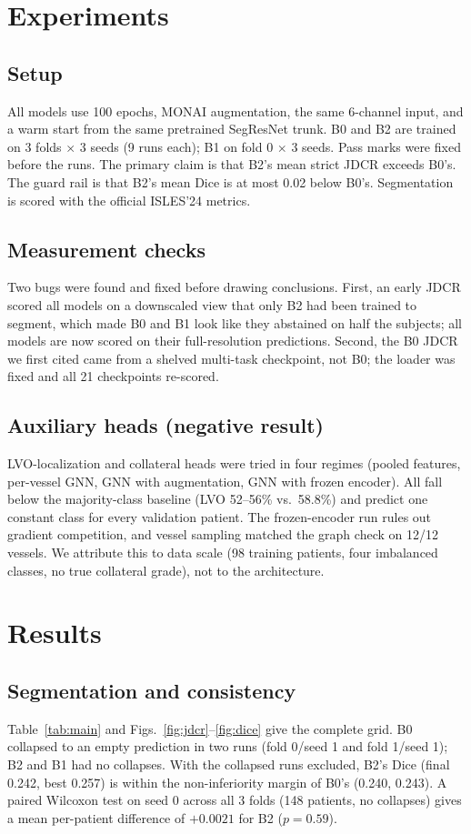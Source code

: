 \documentclass[conference]{IEEEtran}
\begin{document}
\section{Experiments}
\subsection{Setup}
All models use 100 epochs, MONAI augmentation, the same 6-channel input, and a warm start from the same pretrained SegResNet trunk. B0 and B2 are trained on 3 folds $\times$ 3 seeds (9 runs each); B1 on fold 0 $\times$ 3 seeds. Pass marks were fixed before the runs. The primary claim is that B2's mean strict JDCR exceeds B0's. The guard rail is that B2's mean Dice is at most 0.02 below B0's. Segmentation is scored with the official ISLES'24 metrics.

\subsection{Measurement checks}
Two bugs were found and fixed before drawing conclusions. First, an early JDCR scored all models on a downscaled view that only B2 had been trained to segment, which made B0 and B1 look like they abstained on half the subjects; all models are now scored on their full-resolution predictions. Second, the B0 JDCR we first cited came from a shelved multi-task checkpoint, not B0; the loader was fixed and all 21 checkpoints re-scored.

\subsection{Auxiliary heads (negative result)}
LVO-localization and collateral heads were tried in four regimes (pooled features, per-vessel GNN, GNN with augmentation, GNN with frozen encoder). All fall below the majority-class baseline (LVO 52--56\% vs.\ 58.8\%) and predict one constant class for every validation patient. The frozen-encoder run rules out gradient competition, and vessel sampling matched the graph check on 12/12 vessels. We attribute this to data scale (98 training patients, four imbalanced classes, no true collateral grade), not to the architecture.

\section{Results}
\subsection{Segmentation and consistency}
Table~\ref{tab:main} and Figs.~\ref{fig:jdcr}--\ref{fig:dice} give the complete grid. B0 collapsed to an empty prediction in two runs (fold 0/seed 1 and fold 1/seed 1); B2 and B1 had no collapses. With the collapsed runs excluded, B2's Dice (final 0.242, best 0.257) is within the non-inferiority margin of B0's (0.240, 0.243). A paired Wilcoxon test on seed 0 across all 3 folds (148 patients, no collapses) gives a mean per-patient difference of $+0.0021$ for B2 ($p=0.59$).
\end{document}
